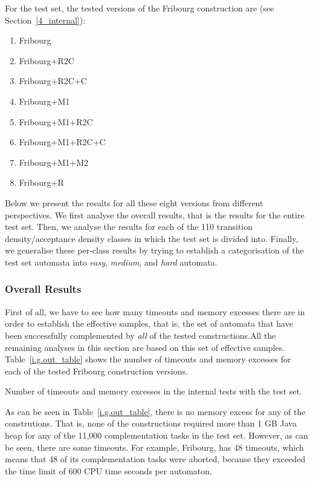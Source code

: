 For the \goal{} test set, the tested versions of the Fribourg construction are (see Section~\ref{4_internal}):
\begin{enumerate}
\item Fribourg
\item Fribourg+R2C
\item Fribourg+R2C+C
\item Fribourg+M1
\item Fribourg+M1+R2C
\item Fribourg+M1+R2C+C
\item Fribourg+M1+M2
\item Fribourg+R
\end{enumerate}

Below we present the results for all these eight versions from different perspectives. We first analyse the overall results, that is the results for the entire test set. Then, we analyse the results for each of the 110 transition density/acceptance density classes in which the \goal{} test set is divided into. Finally, we generalise these per-class results by trying to establish a categorisation of the \goal{} test set automata into \textit{easy}, \textit{medium}, and \textit{hard} automata.

\subsubsection{Overall Results}
First of all, we have to see how many timeouts and memory excesses there are in order to establish the effective samples, that is, the set of automata that have been successfully complemented by \textit{all} of the tested constructions.All the remaining analyses in this section are based on this set of effective samples. Table~\ref{i.g.out_table} shows the number of timeouts and memory excesses for each of the tested Fribourg construction versions.

\begin{table}[ht]
\centering

\caption{Number of timeouts and memory excesses in the internal tests with the \goal{} test set.}
\label{i.g.out_table}
\end{table}

As can be seen in Table~\ref{i.g.out_table}, there is no memory excess for any of the construtions. That is, none of the constructions required more than 1 GB Java heap for any of the 11,000 complementation tasks in the \goal{} test set. However, as can be seen, there are some timeouts. For example, Fribourg, has 48 timeouts, which means that 48 of its complementation tasks were aborted, because they exceeded the time limit of 600 CPU time seconds per automaton.

